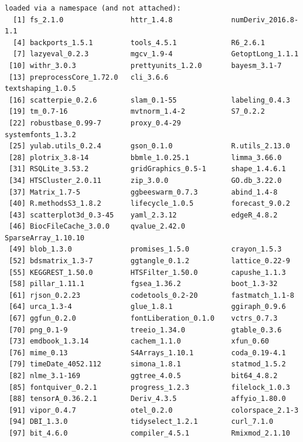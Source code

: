 \documentclass[
  11pt,
]{article}
\begin{document}
\begin{verbatim}
loaded via a namespace (and not attached):
  [1] fs_2.1.0                httr_1.4.8              numDeriv_2016.8-1.1    
  [4] backports_1.5.1         tools_4.5.1             R6_2.6.1               
  [7] lazyeval_0.2.3          mgcv_1.9-4              GetoptLong_1.1.1       
 [10] withr_3.0.3             prettyunits_1.2.0       bayesm_3.1-7           
 [13] preprocessCore_1.72.0   cli_3.6.6               textshaping_1.0.5      
 [16] scatterpie_0.2.6        slam_0.1-55             labeling_0.4.3         
 [19] tm_0.7-16               mvtnorm_1.4-2           S7_0.2.2               
 [22] robustbase_0.99-7       proxy_0.4-29            systemfonts_1.3.2      
 [25] yulab.utils_0.2.4       gson_0.1.0              R.utils_2.13.0         
 [28] plotrix_3.8-14          bbmle_1.0.25.1          limma_3.66.0           
 [31] RSQLite_3.53.2          gridGraphics_0.5-1      shape_1.4.6.1          
 [34] HTSCluster_2.0.11       zip_3.0.0               GO.db_3.22.0           
 [37] Matrix_1.7-5            ggbeeswarm_0.7.3        abind_1.4-8            
 [40] R.methodsS3_1.8.2       lifecycle_1.0.5         forecast_9.0.2         
 [43] scatterplot3d_0.3-45    yaml_2.3.12             edgeR_4.8.2            
 [46] BiocFileCache_3.0.0     qvalue_2.42.0           SparseArray_1.10.10    
 [49] blob_1.3.0              promises_1.5.0          crayon_1.5.3           
 [52] bdsmatrix_1.3-7         ggtangle_0.1.2          lattice_0.22-9         
 [55] KEGGREST_1.50.0         HTSFilter_1.50.0        capushe_1.1.3          
 [58] pillar_1.11.1           fgsea_1.36.2            boot_1.3-32            
 [61] rjson_0.2.23            codetools_0.2-20        fastmatch_1.1-8        
 [64] urca_1.3-4              glue_1.8.1              ggiraph_0.9.6          
 [67] ggfun_0.2.0             fontLiberation_0.1.0    vctrs_0.7.3            
 [70] png_0.1-9               treeio_1.34.0           gtable_0.3.6           
 [73] emdbook_1.3.14          cachem_1.1.0            xfun_0.60              
 [76] mime_0.13               S4Arrays_1.10.1         coda_0.19-4.1          
 [79] timeDate_4052.112       simona_1.8.1            statmod_1.5.2          
 [82] nlme_3.1-169            ggtree_4.0.5            bit64_4.8.2            
 [85] fontquiver_0.2.1        progress_1.2.3          filelock_1.0.3         
 [88] tensorA_0.36.2.1        Deriv_4.3.5             affyio_1.80.0          
 [91] vipor_0.4.7             otel_0.2.0              colorspace_2.1-3       
 [94] DBI_1.3.0               tidyselect_1.2.1        curl_7.1.0             
 [97] bit_4.6.0               compiler_4.5.1          Rmixmod_2.1.10         

\end{verbatim}
\end{document}

